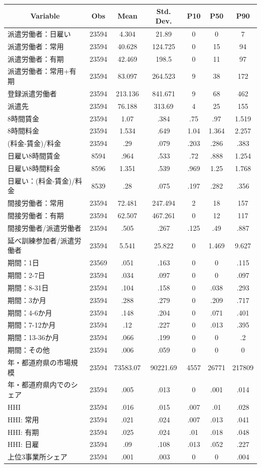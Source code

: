 \begin{tabular}{l c c c  c c c}\hline\hline
\multicolumn{1}{c}{Variable} & Obs & Mean & Std. Dev.
  & P10 & P50 & P90  \\ \hline
派遣労働者：日雇い & 23594 & 4.304 & 21.89  & 0 & 0 & 7 \\
派遣労働者：常用 & 23594 & 40.628 & 124.725  & 0 & 15 & 94 \\
派遣労働者：有期 & 23594 & 42.469 & 198.5  & 0 & 11 & 97 \\
派遣労働者：常用+有期 & 23594 & 83.097 & 264.523  & 9 & 38 & 172 \\
登録派遣労働者 & 23594 & 213.136 & 841.671  & 9 & 68 & 462 \\
派遣先 & 23594 & 76.188 & 313.69  & 4 & 25 & 155 \\
8時間賃金 & 23594 & 1.07 & .384  & .75 & .97 & 1.519 \\
8時間料金 & 23594 & 1.534 & .649  & 1.04 & 1.364 & 2.257 \\
(料金-賃金)/料金 & 23594 & .29 & .079  & .203 & .286 & .383 \\
日雇い8時間賃金 & 8594 & .964 & .533  & .72 & .888 & 1.254 \\
日雇い8時間料金 & 8596 & 1.351 & .539  & .969 & 1.25 & 1.768 \\
日雇い：(料金-賃金)/料金 & 8539 & .28 & .075  & .197 & .282 & .356 \\
間接労働者：常用 & 23594 & 72.481 & 247.494  & 2 & 18 & 157 \\
間接労働者：有期 & 23594 & 62.507 & 467.261  & 0 & 12 & 117 \\
間接労働者/派遣労働者 & 23594 & .505 & .267  & .125 & .49 & .887 \\
延べ訓練参加者/派遣労働者 & 23594 & 5.541 & 25.822  & 0 & 1.469 & 9.627 \\
期間：1日 & 23569 & .051 & .163  & 0 & 0 & .115 \\
期間：2-7日 & 23594 & .034 & .097  & 0 & 0 & .097 \\
期間：8-31日 & 23594 & .104 & .158  & 0 & .038 & .293 \\
期間：3か月 & 23594 & .288 & .279  & 0 & .209 & .717 \\
期間：4-6か月 & 23594 & .148 & .204  & 0 & .071 & .401 \\
期間：7-12か月 & 23594 & .12 & .227  & 0 & .013 & .395 \\
期間：13-36か月 & 23594 & .066 & .199  & 0 & 0 & .2 \\
期間：その他 & 23594 & .006 & .059  & 0 & 0 & 0 \\
年・都道府県の市場規模 & 23594 & 73583.07 & 90221.69  & 4557 & 26771 & 217809 \\
年・都道府県内でのシェア & 23594 & .005 & .013  & 0 & .001 & .014 \\
HHI & 23594 & .016 & .015  & .007 & .01 & .028 \\
HHI: 常用 & 23594 & .021 & .024  & .007 & .013 & .041 \\
HHI: 有期 & 23594 & .025 & .024  & .01 & .018 & .048 \\
HHI: 日雇 & 23594 & .09 & .108  & .013 & .052 & .227 \\
上位3事業所シェア & 23594 & .001 & .003  & 0 & 0 & .004 \\
\hline\end{tabular}
